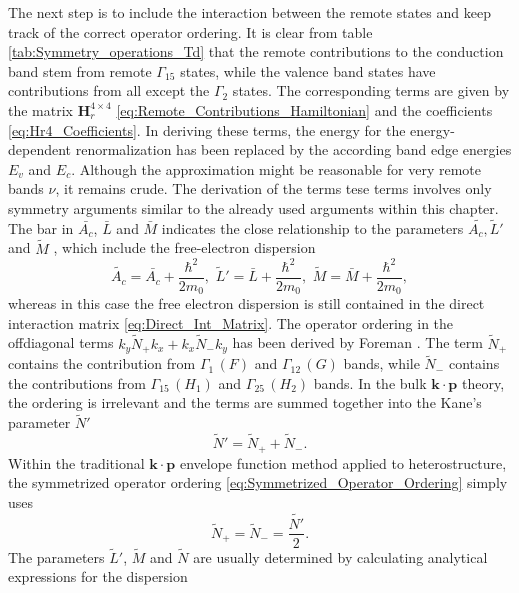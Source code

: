 The next step is to include the interaction between the remote states
and keep track of the correct operator ordering. It is clear from
table \ref{tab:Symmetry_operations_Td} that the remote contributions
to the conduction band stem from remote $\Gamma_{15}$ states, while
the valence band states have contributions from all except the $\Gamma_{2}$
states. The corresponding terms are given by the matrix $\mathbf{H}_{r}^{4\times4}$
\ref{eq:Remote_Contributions_Hamiltonian} and the coefficients \ref{eq:Hr4_Coefficients}.
In deriving these terms, the energy for the energy-dependent renormalization
has been replaced by the according band edge energies $E_{v}$ and
$E_{c}$. Although the approximation might be reasonable for very
remote bands $\nu$, it remains crude. The derivation of the terms
tese terms involves only symmetry arguments similar to the already
used arguments within this chapter. The bar in $\bar{A_{c}}$, $\bar{L}$
and $\bar{M}$ indicates the close relationship to the parameters
$\tilde{A_{c},}\tilde{L}'$ and $\tilde{M}$ , which include the free-electron
dispersion\begin{equation}
\tilde{A_{c}}=\bar{A_{c}}+\frac{\hbar^{2}}{2m_{0}},\,\,\tilde{L}'=\bar{L}+\frac{\hbar^{2}}{2m_{0}},\,\,\tilde{M}=\bar{M}+\frac{\hbar^{2}}{2m_{0}},\end{equation}
whereas in this case the free electron dispersion is still contained
in the direct interaction matrix \ref{eq:Direct_Int_Matrix}. The
operator ordering in the offdiagonal terms $k_{y}\tilde{N}_{+}k_{x}+k_{x}\tilde{N}_{-}k_{y}$
has been derived by Foreman \citealp{Foreman1995b}. The term $\tilde{N}_{+}$
contains the contribution from $\Gamma_{1}\,(F)$ and $\Gamma_{12}\,(G)$
bands, while $\tilde{N}_{-}$ contains the contributions from $\Gamma_{15}\,(H_{1})$
and $\Gamma_{25}\,(H_{2})$ bands. In the bulk $\mathbf{k}\cdot\mathbf{p}$
theory, the ordering is irrelevant and the terms are summed together
into the Kane's parameter $\tilde{N}'$\begin{equation}
\tilde{N}'=\tilde{N}_{+}+\tilde{N}_{-}.\label{eq:Kane_Parameter}\end{equation}
Within the traditional $\mathbf{k}\cdot\mathbf{p}$ envelope function
method applied to heterostructure, the symmetrized operator ordering
\ref{eq:Symmetrized_Operator_Ordering} simply uses\begin{equation}
\tilde{N}_{+}=\tilde{N}_{-}=\frac{\tilde{N'}}{2}.\end{equation}
The parameters $\tilde{L}'$, $\tilde{M}$ and $\tilde{N}$ are usually
determined by calculating analytical expressions for the dispersion
